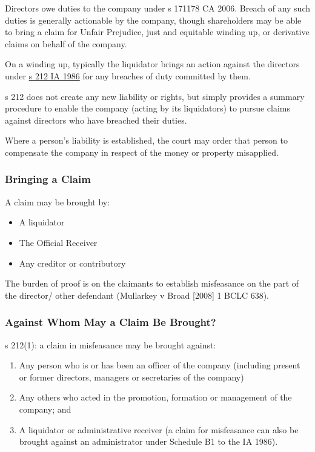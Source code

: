 \documentclass[
]{article}
\providecommand{\tightlist}{%
  \setlength{\itemsep}{0pt}\setlength{\parskip}{0pt}}
\begin{document}
Directors owe duties to the company under s 171178 CA 2006. Breach of
any such duties is generally actionable by the company, though
shareholders may be able to bring a claim for Unfair Prejudice, just and
equitable winding up, or derivative claims on behalf of the company.

On a winding up, typically the liquidator brings an action against the
directors under
\href{https://www.legislation.gov.uk/ukpga/1986/45/section/212}{s 212 IA
1986} for any breaches of duty committed by them.

s 212 does not create any new liability or rights, but simply provides a
summary procedure to enable the company (acting by its liquidators) to
pursue claims against directors who have breached their duties.

Where a person's liability is established, the court may order that
person to compensate the company in respect of the money or property
misapplied.

\hypertarget{bringing-a-claim}{%
\subsubsection{Bringing a Claim}\label{bringing-a-claim}}

A claim may be brought by:

\begin{itemize}
\tightlist
\item
  A liquidator
\item
  The Official Receiver
\item
  Any creditor or contributory
\end{itemize}

The burden of proof is on the claimants to establish misfeasance on the
part of the director/ other defendant (Mullarkey v Broad {[}2008{]} 1
BCLC 638).

\hypertarget{against-whom-may-a-claim-be-brought}{%
\subsubsection{Against Whom May a Claim Be
Brought?}\label{against-whom-may-a-claim-be-brought}}

s 212(1): a claim in misfeasance may be brought against:

\begin{enumerate}
\tightlist
\item
  Any person who is or has been an officer of the company (including
  present or former directors, managers or secretaries of the company)
\item
  Any others who acted in the promotion, formation or management of the
  company; and
\item
  A liquidator or administrative receiver (a claim for misfeasance can
  also be brought against an administrator under Schedule B1 to the IA
  1986).
\end{enumerate}
\end{document}
